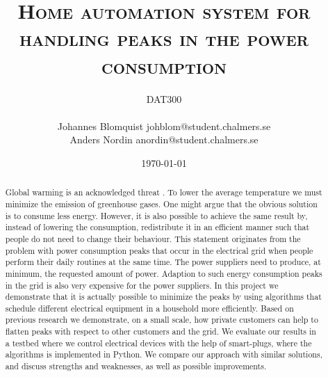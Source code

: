 \documentclass[12pt,a4paper]{article}
\begin{document}
\author{DAT300 \\\\
Johannes Blomquist johblom@student.chalmers.se \\
Anders Nordin anordin@student.chalmers.se \\
}
\title{\textsc{Home automation system for handling peaks in the power consumption}}
\date{\today}

\clearpage\maketitle
\thispagestyle{empty}
\newpage

\thispagestyle{empty}
\begin{abstract}
Global warming is an acknowledged threat \cite{root2003fingerprints}. To lower the average temperature we must minimize the emission of greenhouse gases. One might argue that the obvious solution is to consume less energy. However, it is also possible to achieve the same result by, instead of lowering the consumption, redistribute it in an efficient manner such that people do not need to change their behaviour. This statement originates from the problem with power consumption peaks that occur in the electrical grid when people perform their daily routines at the same time. The power suppliers need to produce, at minimum, the requested amount of power. Adaption to such energy consumption peaks in the grid is also very expensive for the power suppliers. In this project we demonstrate that it is actually possible to minimize the peaks by using algorithms that schedule different electrical equipment in a household more efficiently. Based on previous research we demonstrate, on a small scale, how private customers can help to flatten peaks with respect to other customers and the grid. We evaluate our results in a testbed where we control electrical devices with the help of smart-plugs, where the algorithms is implemented in Python. We compare our approach with similar solutions, and discuss strengths and weaknesses, as well as possible improvements.

\end{abstract}
\newpage
\clearpage
\tableofcontents
\newpage

\setcounter{page}{1}

\newpage

\newpage

\newpage

\newpage

\newpage
\medskip
\printbibliography
\end{document}
